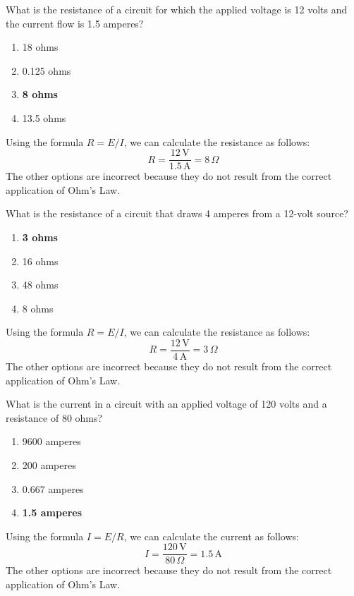 
\begin{tcolorbox}[colback=gray!10!white,colframe=black!75!black,title={T5D05}]
    What is the resistance of a circuit for which the applied voltage is 12 volts and the current flow is 1.5 amperes?
    \begin{enumerate}[label=\Alph*,noitemsep]
        \item 18 ohms
        \item 0.125 ohms
        \item \textbf{8 ohms}
        \item 13.5 ohms
    \end{enumerate}
\end{tcolorbox}
Using the formula \(R = E / I\), we can calculate the resistance as follows:
\[
R = \frac{12\, \text{V}}{1.5\, \text{A}} = 8\, \Omega
\]
The other options are incorrect because they do not result from the correct application of Ohm's Law.


\begin{tcolorbox}[colback=gray!10!white,colframe=black!75!black,title={T5D06}]
    What is the resistance of a circuit that draws 4 amperes from a 12-volt source?
    \begin{enumerate}[label=\Alph*,noitemsep]
        \item \textbf{3 ohms}
        \item 16 ohms
        \item 48 ohms
        \item 8 ohms
    \end{enumerate}
\end{tcolorbox}
Using the formula \(R = E / I\), we can calculate the resistance as follows:
\[
R = \frac{12\, \text{V}}{4\, \text{A}} = 3\, \Omega
\]
The other options are incorrect because they do not result from the correct application of Ohm's Law.


\begin{tcolorbox}[colback=gray!10!white,colframe=black!75!black,title={T5D07}]
    What is the current in a circuit with an applied voltage of 120 volts and a resistance of 80 ohms?
    \begin{enumerate}[label=\Alph*,noitemsep]
        \item 9600 amperes
        \item 200 amperes
        \item 0.667 amperes
        \item \textbf{1.5 amperes}
    \end{enumerate}
\end{tcolorbox}
Using the formula \(I = E / R\), we can calculate the current as follows:
\[
I = \frac{120\, \text{V}}{80\, \Omega} = 1.5\, \text{A}
\]
The other options are incorrect because they do not result from the correct application of Ohm's Law.

